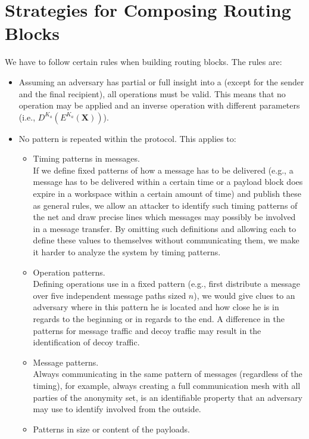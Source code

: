 \section{Strategies for Composing Routing Blocks}\label{sec:routingStrategies}
We have to follow certain rules when building routing blocks. The rules are:
\begin{itemize}
	\item Assuming an adversary has partial or full insight into a  (except for the sender and the final recipient), all operations must be valid. This means that no operation may be applied and an inverse operation with different parameters  (i.e., $D^{K_a}\left(E^{K_a}\left(\textbf{X}\right)\right)$).
	\item No pattern is repeated within the protocol. This applies to:
	\begin{itemize}
		\item Timing patterns in messages.\\
		      If we define fixed patterns of how a message has to be delivered (e.g., a message has to be delivered within a certain time or a payload block does expire in a workspace within a certain amount of time) and publish these as general rules, we allow an attacker to identify such timing patterns of the net and draw precise lines which messages may possibly be involved in a message transfer. By omitting such definitions and allowing each  to define these values to themselves without communicating them, we make it harder to analyze the system by timing patterns.
		\item Operation patterns.\\
		      Defining operations use in a fixed pattern (e.g., first distribute a message over five independent message paths sized $n$), we would give clues to an adversary where in this pattern he is located and how close he is in regards to the beginning or in regards to the end. A difference in the patterns for message traffic and decoy traffic may result in the identification of decoy traffic.
		\item Message patterns.\\
		      Always communicating in the same pattern of messages (regardless of the timing), for example, always creating a full communication mesh with all parties of the anonymity set, is an identifiable property that an adversary may use to identify involved \VortexNodes from the outside.
		\item Patterns in size or content of the payloads.\\

\end{itemize}
\end{itemize}
